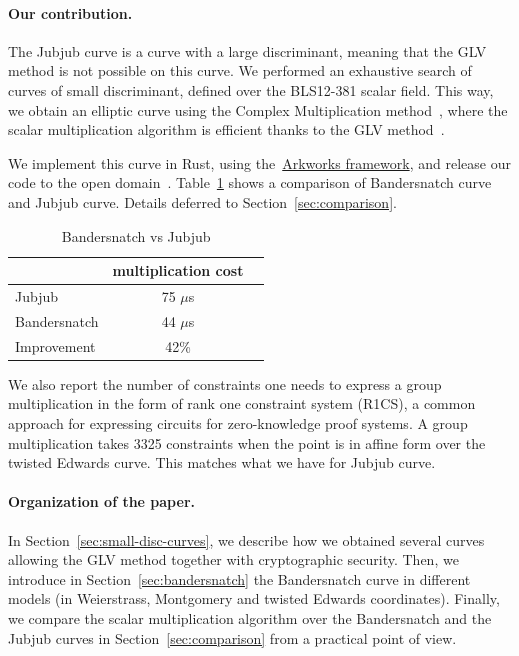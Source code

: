 \documentclass{article}
\theoremstyle{definition}
\begin{document}
\paragraph{Our contribution.}
The Jubjub curve is a curve with a large discriminant, meaning that
the GLV method is not possible on this curve.
We performed an exhaustive search of curves of small discriminant,
defined over the BLS12-381 scalar field. This way, we obtain an
elliptic curve using the Complex Multiplication
method~\cite{MC:AtkMor93}, where the scalar multiplication algorithm
is efficient thanks to the GLV method~\cite{C:GalLamVan01}.

We implement this curve in Rust, using
the~\href{http://arkworks.rs}{Arkworks framework}, and release our
code to the open domain~\cite{bandersnatch-rust}.
Table~\ref{tab:comp} shows a comparison of Bandersnatch curve
and Jubjub curve. 
Details deferred to Section~\ref{sec:comparison}.

\begin{table}[ht] %
  \centering
  
  \begin{tabular}{|l|c|c|}\hline
      & multiplication cost  \\\hline\hline
    Jubjub & 75 $\mu$s   \\\hline
    Bandersnatch & 44 $\mu$s   \\\hline\hline   
    Improvement & 42\% \\\hline
  \end{tabular}
  \caption{Bandersnatch vs Jubjub}
  \label{tab:comp}
\end{table}

We also report the number of 
constraints one needs to express a group multiplication
in the form of rank one constraint system (R1CS), 
a common approach for expressing circuits for zero-knowledge 
proof systems. 
A group multiplication takes 
3325
constraints when the point is in affine form over the 
twisted Edwards curve.
This matches what we have for Jubjub curve.

\paragraph{Organization of the paper.}
In Section~\ref{sec:small-disc-curves}, we describe how we obtained
several curves allowing the GLV method together with cryptographic
security.
Then, we introduce in Section~\ref{sec:bandersnatch} the Bandersnatch
curve in different models (in Weierstrass, Montgomery and twisted Edwards
coordinates).
Finally, we compare the scalar multiplication algorithm over
the Bandersnatch and the Jubjub curves in
Section~\ref{sec:comparison} from a practical point of view.
\end{document}
